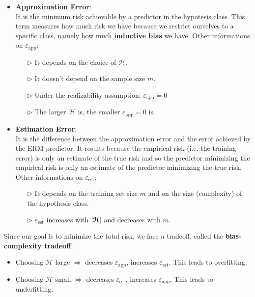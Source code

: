 \documentclass[../../main/main.tex]{subfiles}
\begin{document}
\begin{itemize}
    \item \textbf{Approximation Error}:\\
        It is the minimum risk achievable by a predictor in the hypotesis class. This term measures how much risk we have because we restrict ourselves to a specific class, namely how much \textbf{inductive bias} we have. Other informations on \( \varepsilon_{\text{app}} \):
        \begin{itemize}
            \item[$\triangleright$] It depends on the choice of \( \mathcal{H} \).
            \item[$\triangleright$] It doesn't depend on the sample size \( m \).
            \item[$\triangleright$] Under the realizability assumption: \( \varepsilon_{\text{app}} = 0 \)
            \item[$\triangleright$] The larger \( \mathcal{H} \) is, the smaller \( \varepsilon_{\text{app}} = 0 \) is.
        \end{itemize}

    \item \textbf{Estimation Error}:\\
        It is the difference between the approximation error and the error achieved by the ERM predictor. It results because the empirical risk (i.e. the training error) is only an estimate of the true risk and so the predictor minimizing the empirical risk is only an estimate of the predictor minimizing the true risk. Other informations on \( \varepsilon_{\text{est}} \):
        \begin{itemize}
            \item[$\triangleright$] It depends on the training set size \( m \) and on the size (complexity) of the hypothesis class.
            \item[$\triangleright$] \( \varepsilon_{\text{est}} \) increases with \( \abs{\mathcal{H}} \) and decreases with \( m \).
        \end{itemize}
\end{itemize}

Since our goal is to minimize the total risk, we face a tradeoff, called the \textbf{bias-complexity tradeoff}:
\begin{itemize}
    \item Choosing \( \mathcal{H} \) large \( \Longrightarrow \) decreases \( \varepsilon_{\text{app}} \), increases \( \varepsilon_{\text{est}} \). This leads to overfitting.
    \item Choosing \( \mathcal{H} \) small \( \Longrightarrow \) decreases \( \varepsilon_{\text{est}} \), increases \( \varepsilon_{\text{app}} \). This leads to underfitting.
\end{itemize}
\end{document}

